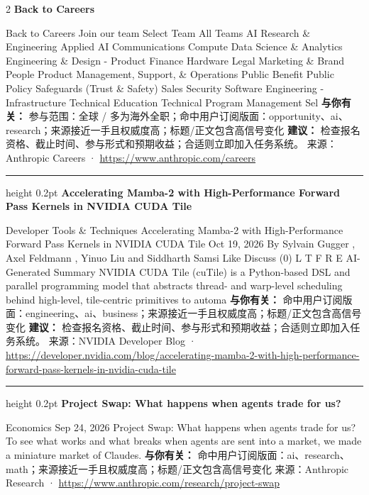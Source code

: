 \documentclass[10.5pt]{ctexart}
\begin{document}
\begin{multicols}{2}
{\large\bfseries Back to Careers}\par
Back to Careers Join our team Select Team All Teams AI Research \& Engineering Applied AI Communications Compute Data Science \& Analytics Engineering \& Design - Product Finance Hardware Legal Marketing \& Brand People Product Management, Support, \& Operations Public Benefit Public Policy Safeguards (Trust \& Safety) Sales Security Software Engineering - Infrastructure Technical Education Technical Program Management Sel
\textbf{与你有关：} 参与范围：全球 / 多为海外全职；命中用户订阅版面：opportunity、ai、research；来源接近一手且权威度高；标题/正文包含高信号变化
\textbf{建议：} 检查报名资格、截止时间、参与形式和预期收益；合适则立即加入任务系统。
{\footnotesize\color{ormuted} 来源：Anthropic Careers · \url{https://www.anthropic.com/careers}}
\vspace{2mm}
\hrule height 0.2pt
\vspace{2mm}
{\large\bfseries Accelerating Mamba-2 with High-Performance Forward Pass Kernels in NVIDIA CUDA Tile}\par
Developer Tools \& Techniques Accelerating Mamba-2 with High-Performance Forward Pass Kernels in NVIDIA CUDA Tile Oct 19, 2026 By Sylvain Gugger , Axel Feldmann , Yinuo Liu and Siddharth Samsi Like Discuss (0) L T F R E AI-Generated Summary NVIDIA CUDA Tile (cuTile) is a Python-based DSL and parallel programming model that abstracts thread- and warp-level scheduling behind high-level, tile-centric primitives to automa
\textbf{与你有关：} 命中用户订阅版面：engineering、ai、business；来源接近一手且权威度高；标题/正文包含高信号变化
\textbf{建议：} 检查报名资格、截止时间、参与形式和预期收益；合适则立即加入任务系统。
{\footnotesize\color{ormuted} 来源：NVIDIA Developer Blog · \url{https://developer.nvidia.com/blog/accelerating-mamba-2-with-high-performance-forward-pass-kernels-in-nvidia-cuda-tile}}
\vspace{2mm}
\hrule height 0.2pt
\vspace{2mm}
{\large\bfseries Project Swap: What happens when agents trade for us?}\par
Economics Sep 24, 2026 Project Swap: What happens when agents trade for us? To see what works and what breaks when agents are sent into a market, we made a miniature market of Claudes.
\textbf{与你有关：} 命中用户订阅版面：ai、research、math；来源接近一手且权威度高；标题/正文包含高信号变化
{\footnotesize\color{ormuted} 来源：Anthropic Research · \url{https://www.anthropic.com/research/project-swap}}

\end{multicols}
\end{document}
